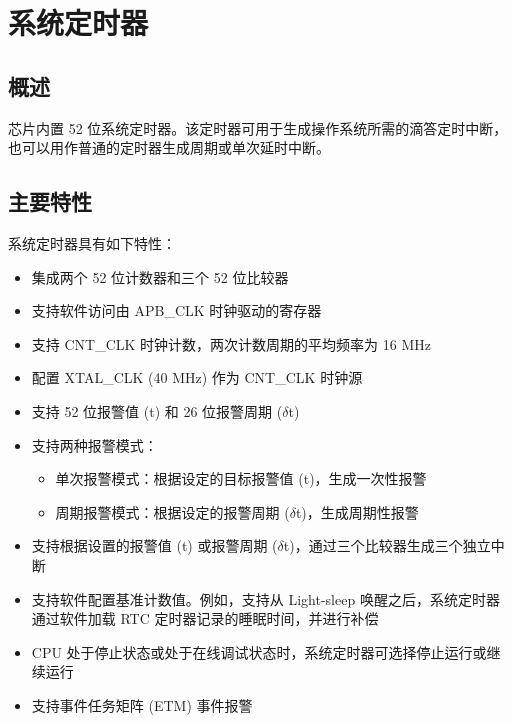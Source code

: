 \documentclass[main\_\_CN.tex]{subfiles}
\begin{document}

\ifglobal
\else
    {\let\clearpage\relax \listoftodos}
    {\let\clearpage\relax \listofdonetodos}
    \tableofcontents
\fi



\hypertarget{systimer}{}
\chapter{系统定时器}
\label{mod:systimer}

\section{概述}
\chipname{} 芯片内置 52 位系统定时器。该定时器可用于生成操作系统所需的滴答定时中断，也可以用作普通的定时器生成周期或单次延时中断。


\section{主要特性}

系统定时器具有如下特性：

\begin{itemize}
    \item 集成两个 52 位计数器和三个 52 位比较器
    \item 支持软件访问由 APB\_CLK 时钟驱动的寄存器
    \item 支持 CNT\_CLK 时钟计数，两次计数周期的平均频率为 16 MHz
    \item 配置 XTAL\_CLK (40 MHz) 作为 CNT\_CLK 时钟源
    \item 支持 52 位报警值 (t) 和 26 位报警周期 ($\delta$t)
    \item 支持两种报警模式：
    \begin{itemize}
        \item 单次报警模式：根据设定的目标报警值 (t)，生成一次性报警
        \item 周期报警模式：根据设定的报警周期 ($\delta$t)，生成周期性报警
    \end{itemize}
    \item 支持根据设置的报警值 (t) 或报警周期 ($\delta$t)，通过三个比较器生成三个独立中断
    \item 支持软件配置基准计数值。例如，支持从 Light-sleep 唤醒之后，系统定时器通过软件加载 RTC 定时器记录的睡眠时间，并进行补偿
    \item CPU 处于停止状态或处于在线调试状态时，系统定时器可选择停止运行或继续运行
    \item 支持事件任务矩阵 (ETM) 事件报警
\end{itemize}
\end{document}
